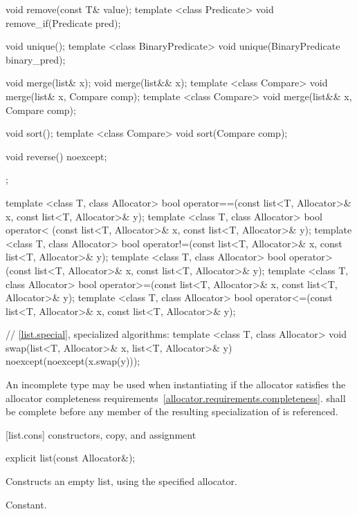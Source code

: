 \begin{codeblock}
{{    void remove(const T& value);
    template <class Predicate> void remove_if(Predicate pred);

    void unique();
    template <class BinaryPredicate>
      void unique(BinaryPredicate binary_pred);

    void merge(list& x);
    void merge(list&& x);
    template <class Compare> void merge(list& x, Compare comp);
    template <class Compare> void merge(list&& x, Compare comp);

    void sort();
    template <class Compare> void sort(Compare comp);

    void reverse() noexcept;
  };

  template <class T, class Allocator>
    bool operator==(const list<T, Allocator>& x, const list<T, Allocator>& y);
  template <class T, class Allocator>
    bool operator< (const list<T, Allocator>& x, const list<T, Allocator>& y);
  template <class T, class Allocator>
    bool operator!=(const list<T, Allocator>& x, const list<T, Allocator>& y);
  template <class T, class Allocator>
    bool operator> (const list<T, Allocator>& x, const list<T, Allocator>& y);
  template <class T, class Allocator>
    bool operator>=(const list<T, Allocator>& x, const list<T, Allocator>& y);
  template <class T, class Allocator>
    bool operator<=(const list<T, Allocator>& x, const list<T, Allocator>& y);

  // \ref{list.special}, specialized algorithms:
  template <class T, class Allocator>
    void swap(list<T, Allocator>& x, list<T, Allocator>& y)
      noexcept(noexcept(x.swap(y)));
}
\end{codeblock}

\pnum
An incomplete type  may be used when instantiating 
if the allocator satisfies the
allocator completeness requirements~\ref{allocator.requirements.completeness}.
 shall be complete before any member of the resulting specialization
of  is referenced.

[list.cons]{ constructors, copy, and assignment}

%
\begin{itemdecl}
explicit list(const Allocator&);
\end{itemdecl}

\begin{itemdescr}
\pnum
\effects
Constructs an empty list, using the specified allocator.

\pnum
\complexity
Constant.
\end{itemdescr}

